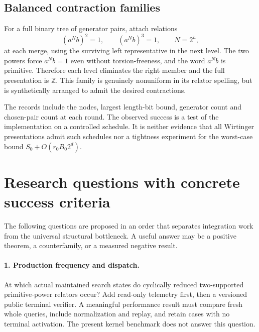 \documentclass[11pt,letterpaper]{article}
\theoremstyle{definition}
\newcommand{\Z}{\mathbb Z}
\begin{document}
\subsection{Balanced contraction families}
For a full binary tree of generator pairs, attach relations
\[
 (a^N b)^2=1,\qquad (a^N b)^3=1,
 \qquad N=2^h,
\]
at each merge, using the surviving left representative in the next level.
The two powers force $a^Nb=1$ even without torsion-freeness, and the word
$a^Nb$ is primitive. Therefore each level eliminates the right member and
the full presentation is $\Z$. This family is genuinely nonuniform in its
relator spelling, but is synthetically arranged to admit the desired
contractions.

\begin{table}[ht]
\centering\small

\caption{Single-run conditional contraction experiments on the explicit
balanced presentation family, with $h=32$. Initial-family construction is
outside these contraction timings.}
\label{tab:contractions}
\end{table}

The records include the nodes, largest length-bit bound, generator count and
chosen-pair count at each round. The observed success is a test of the
implementation on a controlled schedule. It is neither evidence that all
Wirtinger presentations admit such schedules nor a tightness experiment for
the worst-case bound $S_0+O(r_0B_0 2^d)$.

\section{Research questions with concrete success criteria}
\label{sec:questions}
The following questions are proposed in an order that separates integration
work from the universal structural bottleneck. A useful answer may be a
positive theorem, a counterfamily, or a measured negative result.

\paragraph{1. Production frequency and dispatch.}
At which actual maintained search states do cyclically reduced two-supported
primitive-power relators occur? Add read-only telemetry first, then a
versioned public terminal verifier. A meaningful performance result must
compare fresh whole queries, include normalization and replay, and retain
cases with no terminal activation. The present kernel benchmark does not
answer this question.
\end{document}

